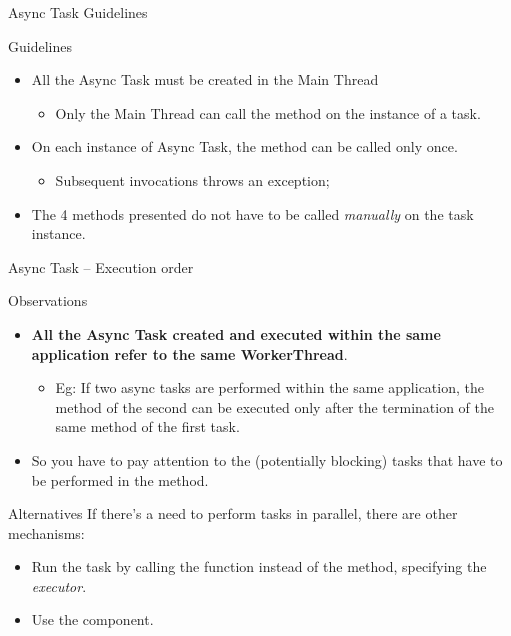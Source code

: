 \documentclass{beamer}
\begin{document}
  \begin{frame}{Async Task Guidelines}
    \begin{block}{Guidelines}
      \begin{itemize}
        \item All the Async Task must be created in the Main Thread
        \begin{itemize}
          \item Only the Main Thread can call the  method on
          the instance of a task.
        \end{itemize}
        \item On each instance of Async Task, the  method can
        be called only once.
        \begin{itemize}
          \item Subsequent invocations throws an exception;
        \end{itemize}
        \item The 4 methods presented do not have to be called \textit{manually}
        on the task instance.
      \end{itemize}
    \end{block}
  \end{frame}


  \begin{frame}{Async Task -- Execution order}
    \begin{block}{Observations}
      \begin{itemize}
        \item \textbf{All the Async Task created and executed within the same application
        refer to the same WorkerThread}.  
        \begin{itemize}
          \item Eg: \small{If two async tasks are performed within the same
          application, the  method of the second can be
          executed only after the termination of the same method of the first
          task.}
        \end{itemize}
        \item So you have to pay attention to the (potentially blocking) tasks
        that have to be performed in the  method.  
      \end{itemize}
    \end{block}
    \begin{block}{Alternatives}
      If there's a need to perform tasks in parallel, there are other
      mechanisms:
      \begin{itemize}
        \item Run the task by calling the  function
        instead of the  method, specifying the \textit{executor}.
        \item Use the  component.
      \end{itemize}
    \end{block}
  \end{frame}
\end{document}
